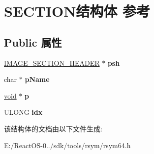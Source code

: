 \hypertarget{struct_s_e_c_t_i_o_n}{}\section{S\+E\+C\+T\+I\+O\+N结构体 参考}
\label{struct_s_e_c_t_i_o_n}
\subsection*{Public 属性}
\begin{DoxyCompactItemize}
\item 
\mbox{\label{struct_s_e_c_t_i_o_n_a7a1cc22bba3d131de1712158c5e89996}} 
\hyperlink{struct___i_m_a_g_e___s_e_c_t_i_o_n___h_e_a_d_e_r}{I\+M\+A\+G\+E\+\_\+\+S\+E\+C\+T\+I\+O\+N\+\_\+\+H\+E\+A\+D\+ER} $\ast$ {\bfseries psh}
\item 
\mbox{\label{struct_s_e_c_t_i_o_n_acdf5515feaf480efdfff5b5e8b053865}} 
char $\ast$ {\bfseries p\+Name}
\item 
\mbox{\label{struct_s_e_c_t_i_o_n_ac4cedd8ac2f9837c0eab0e42d5872f7e}} 
\hyperlink{interfacevoid}{void} $\ast$ {\bfseries p}
\item 
\mbox{\label{struct_s_e_c_t_i_o_n_a47f16c6ef6581fb11608060636560a09}} 
U\+L\+O\+NG {\bfseries idx}
\end{DoxyCompactItemize}


该结构体的文档由以下文件生成\+:\begin{DoxyCompactItemize}
\item 
E\+:/\+React\+O\+S-\/0../sdk/tools/rsym/rsym64.\+h\end{DoxyCompactItemize}
